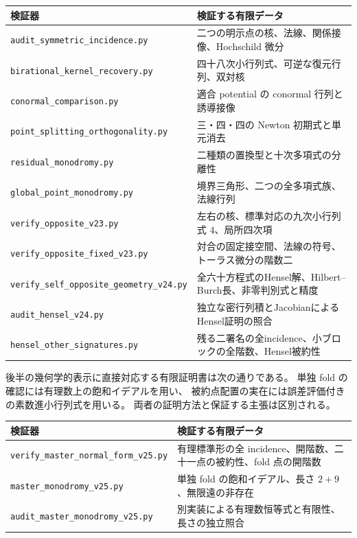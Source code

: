 \begin{center}\small
\begin{tabular}{p{.46\linewidth}p{.45\linewidth}}
\toprule
検証器&検証する有限データ\\\midrule
\nolinkurl{audit_symmetric_incidence.py}&二つの明示点の核、法線、関係接像、Hochschild 微分\\
\nolinkurl{birational_kernel_recovery.py}&四十八次小行列式、可逆な復元行列、双対核\\
\nolinkurl{conormal_comparison.py}&適合 potential の conormal 行列と誘導接像\\
\nolinkurl{point_splitting_orthogonality.py}&三・四・四の Newton 初期式と単元消去\\
\nolinkurl{residual_monodromy.py}&二種類の置換型と十次多項式の分離性\\
\nolinkurl{global_point_monodromy.py}&境界三角形、二つの全多項式族、法線行列\\
\nolinkurl{verify_opposite_v23.py}&左右の核、標準対応の九次小行列式 $4$、局所四次項\\
\nolinkurl{verify_opposite_fixed_v23.py}&対合の固定接空間、法線の符号、トーラス微分の階数二\\
\nolinkurl{verify_self_opposite_geometry_v24.py}&全六十方程式のHensel解、Hilbert--Burch長、非零判別式と精度\\
\nolinkurl{audit_hensel_v24.py}&独立な密行列積とJacobianによるHensel証明の照合\\
\nolinkurl{hensel_other_signatures.py}&残る二署名の全incidence、小ブロックの全階数、Hensel被約性\\
\bottomrule
\end{tabular}\end{center}

後半の幾何学的表示に直接対応する有限証明書は次の通りである。
単独 fold の確認には有理数上の飽和イデアルを用い、
被約点配置の実在には誤差評価付きの素数進小行列式を用いる。
両者の証明方法と保証する主張は区別される。
\begin{center}\small
\begin{tabular}{p{.46\linewidth}p{.45\linewidth}}
\toprule
検証器&検証する有限データ\\\midrule
\nolinkurl{verify_master_normal_form_v25.py}&有理標準形の全 incidence、開階数、二十一点の被約性、fold 点の開階数\\
\nolinkurl{master_monodromy_v25.py}&単独 fold の飽和イデアル、長さ $2+9$、無限遠の非存在\\
\nolinkurl{audit_master_monodromy_v25.py}&別実装による有理数恒等式と有限性、長さの独立照合\\
\bottomrule
\end{tabular}\end{center}

